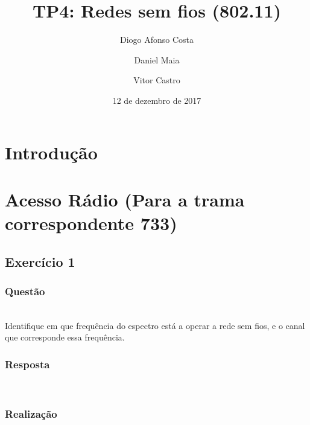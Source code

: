 \documentclass{llncs}
\begin{document}
\mainmatter
\title{TP4: Redes sem fios (802.11)}


\author{Diogo Afonso Costa \and Daniel Maia \and Vitor Castro}



\date{12 de dezembro de 2017}


\maketitle
\begin{abstract}

\end{abstract}

\section{Introdução}



\clearpage
\section{Acesso Rádio (Para a trama correspondente 733)}

\subsection{Exercício 1}
\subsubsection{Questão}\rule[-10pt]{0pt}{10pt}\\

Identifique em que frequência do espectro está a operar a rede sem fios, e o canal que corresponde essa frequência.

\subsubsection{Resposta}\rule[-10pt]{0pt}{10pt}\\



\subsubsection{Realização}\rule[-10pt]{0pt}{10pt}\\
\end{document}
